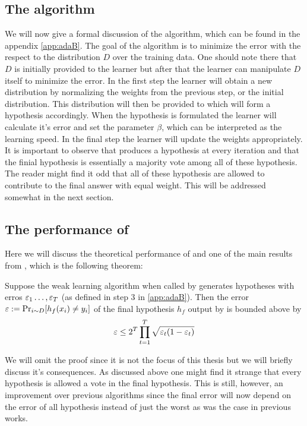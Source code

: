 \subsection{The algorithm}
\label{subsec:algo}
We will now give a formal discussion of the \adaB\cite{Freund1997} algorithm, which can be found in the appendix \ref{app:adaB}. The goal of the algorithm is to minimize the error with the respect to the distribution $D$ over the training data. One should note there that $D$ is initially provided to the learner but after that the learner can manipulate $D$ itself to minimize the error. In the first step the learner will obtain a new distribution by normalizing the weights from the previous step, or the initial distribution. This distribution will then be provided to \weak which will form a hypothesis accordingly. When the hypothesis is formulated the learner will calculate it's error and set the parameter $\beta$, which can be interpreted as the learning speed. In the final step the learner will update the weights appropriately. It is important to observe that \weak produces a hypothesis at every iteration and that the finial hypothesis is essentially a majority vote among all of these hypothesis. The reader might find it odd that all of these hypothesis are allowed to contribute to the final answer with equal weight. This will be addressed somewhat in the next section.  

\subsection{The performance of \adaB}
\label{subsec:perf}
Here we will discuss the theoretical performance of \adaB and one of the main results from \cite{Freund1997}, which is the following theorem: 
\begin{theorem}\label{thm:adaErr}\cite{Freund1997}
Suppose the weak learning algorithm \weak when called by \adaB generates hypotheses with erros $\varepsilon_1\ldots, \varepsilon_T$ (as defined in step 3 in \ref{app:adaB}). Then the error \\$\varepsilon:=\Pr_{i\sim D}[h_f(x_i)\neq y_i]$ of the final hypothesis $h_f$ output by \adaB is bounded above by $$\varepsilon\leq 2^T\prod^T_{t=1}\sqrt{\varepsilon_t(1-\varepsilon_t)}$$
\end{theorem}
We will omit the proof since it is not the focus of this thesis but we will briefly discuss it's consequences. As discussed above one might find it strange that every hypothesis is allowed a vote in the final hypothesis. This is still, however, an improvement over previous algorithms since the final error will now depend on the error of all hypothesis instead of just the worst as was the case in previous works. 